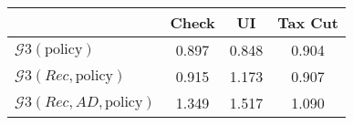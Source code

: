\begin{tabular}{@{}lccc@{}}
\toprule
                          & Check      & UI    & Tax Cut    \\  \midrule
$\mathcal{G}3(\text{policy})$ & 0.897  & 0.848  & 0.904     \\
$\mathcal{G}3(Rec,\text{policy})$ & 0.915  & 1.173  & 0.907     \\
$\mathcal{G}3(Rec, AD,\text{policy})$ & 1.349  & 1.517  & 1.090     \\
\end{tabular}
